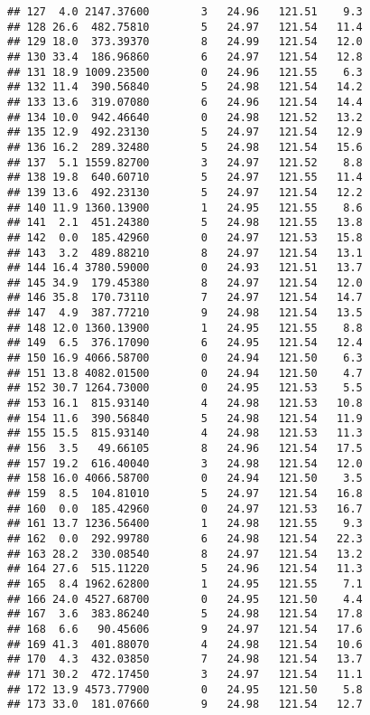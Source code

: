\documentclass[
]{article}
\begin{document}
\begin{verbatim}
## 127  4.0 2147.37600        3   24.96   121.51    9.3
## 128 26.6  482.75810        5   24.97   121.54   11.4
## 129 18.0  373.39370        8   24.99   121.54   12.0
## 130 33.4  186.96860        6   24.97   121.54   12.8
## 131 18.9 1009.23500        0   24.96   121.55    6.3
## 132 11.4  390.56840        5   24.98   121.54   14.2
## 133 13.6  319.07080        6   24.96   121.54   14.4
## 134 10.0  942.46640        0   24.98   121.52   13.2
## 135 12.9  492.23130        5   24.97   121.54   12.9
## 136 16.2  289.32480        5   24.98   121.54   15.6
## 137  5.1 1559.82700        3   24.97   121.52    8.8
## 138 19.8  640.60710        5   24.97   121.55   11.4
## 139 13.6  492.23130        5   24.97   121.54   12.2
## 140 11.9 1360.13900        1   24.95   121.55    8.6
## 141  2.1  451.24380        5   24.98   121.55   13.8
## 142  0.0  185.42960        0   24.97   121.53   15.8
## 143  3.2  489.88210        8   24.97   121.54   13.1
## 144 16.4 3780.59000        0   24.93   121.51   13.7
## 145 34.9  179.45380        8   24.97   121.54   12.0
## 146 35.8  170.73110        7   24.97   121.54   14.7
## 147  4.9  387.77210        9   24.98   121.54   13.5
## 148 12.0 1360.13900        1   24.95   121.55    8.8
## 149  6.5  376.17090        6   24.95   121.54   12.4
## 150 16.9 4066.58700        0   24.94   121.50    6.3
## 151 13.8 4082.01500        0   24.94   121.50    4.7
## 152 30.7 1264.73000        0   24.95   121.53    5.5
## 153 16.1  815.93140        4   24.98   121.53   10.8
## 154 11.6  390.56840        5   24.98   121.54   11.9
## 155 15.5  815.93140        4   24.98   121.53   11.3
## 156  3.5   49.66105        8   24.96   121.54   17.5
## 157 19.2  616.40040        3   24.98   121.54   12.0
## 158 16.0 4066.58700        0   24.94   121.50    3.5
## 159  8.5  104.81010        5   24.97   121.54   16.8
## 160  0.0  185.42960        0   24.97   121.53   16.7
## 161 13.7 1236.56400        1   24.98   121.55    9.3
## 162  0.0  292.99780        6   24.98   121.54   22.3
## 163 28.2  330.08540        8   24.97   121.54   13.2
## 164 27.6  515.11220        5   24.96   121.54   11.3
## 165  8.4 1962.62800        1   24.95   121.55    7.1
## 166 24.0 4527.68700        0   24.95   121.50    4.4
## 167  3.6  383.86240        5   24.98   121.54   17.8
## 168  6.6   90.45606        9   24.97   121.54   17.6
## 169 41.3  401.88070        4   24.98   121.54   10.6
## 170  4.3  432.03850        7   24.98   121.54   13.7
## 171 30.2  472.17450        3   24.97   121.54   11.1
## 172 13.9 4573.77900        0   24.95   121.50    5.8
## 173 33.0  181.07660        9   24.98   121.54   12.7

\end{verbatim}
\end{document}
